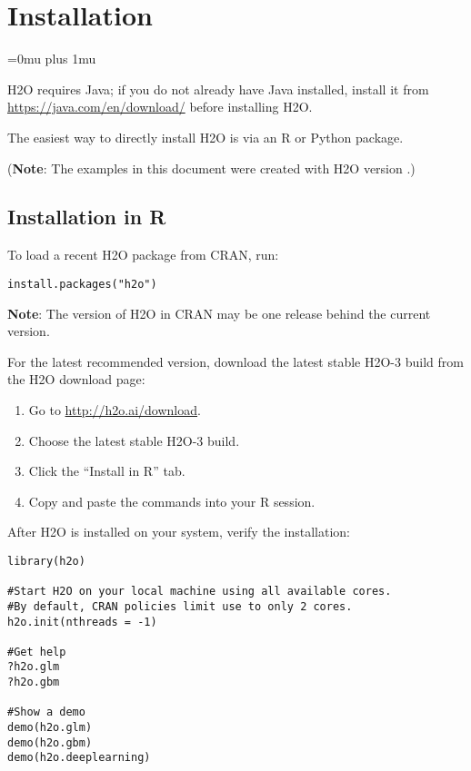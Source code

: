 \documentclass{standalone}
\begin{document}
\section{Installation} 
\Urlmuskip=0mu plus 1mu\relax %

H2O requires Java; if you do not already have Java installed, install it from {\url{https://java.com/en/download/}} before installing H2O. 

The easiest way to directly install H2O is  via an R or Python package.

({\bf{Note}}: The examples in this document were created with H2O version \waterVersion.)

\subsection{Installation in R}

To load a recent H2O package from CRAN, run:

\begin{lstlisting}[style=R]
install.packages("h2o")
\end{lstlisting}

{\bf{Note}}: The version of H2O in CRAN may be one release behind the current version.

For the latest recommended version, download the
latest stable H2O-3 build from the H2O download page:

\begin{minipage}{\textwidth}

\begin{enumerate}
\item Go to {\url{http://h2o.ai/download}}.
\item Choose the latest stable H2O-3 build.
\item Click the ``Install in R'' tab.
\item Copy and paste the commands into your R session.
\end{enumerate}

\end{minipage}

After H2O is installed on your system, verify the installation:

\begin{minipage}{\textwidth}

\begin{lstlisting}[style=R]
library(h2o)

#Start H2O on your local machine using all available cores.
#By default, CRAN policies limit use to only 2 cores.
h2o.init(nthreads = -1)

#Get help
?h2o.glm
?h2o.gbm

#Show a demo
demo(h2o.glm)
demo(h2o.gbm)
demo(h2o.deeplearning)
\end{lstlisting}

\end{minipage}
\end{document}
